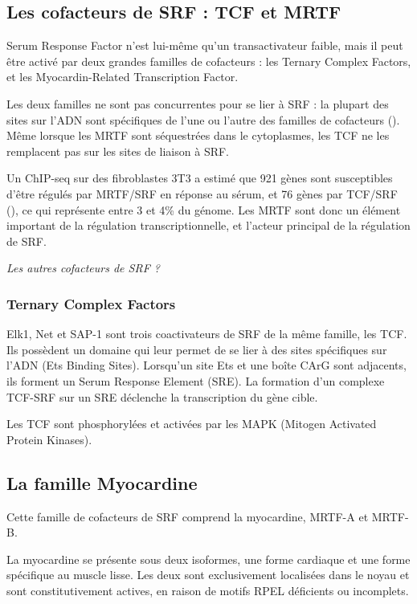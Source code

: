 \documentclass{report}
\begin{document}
\subsection{Les cofacteurs de SRF : TCF et MRTF}

Serum Response Factor n'est lui-même qu'un transactivateur faible, mais il peut être activé par deux grandes familles de cofacteurs : les Ternary Complex Factors, et les Myocardin-Related Transcription Factor. 

Les deux familles ne sont pas concurrentes pour se lier à SRF : la plupart des sites sur l'ADN sont spécifiques de l'une ou l'autre des familles de cofacteurs (\cite{esnault_rho-actin_2014}). Même lorsque les MRTF sont séquestrées dans le cytoplasmes, les TCF ne les remplacent pas sur les sites de liaison à SRF. 

Un ChIP-seq sur des fibroblastes 3T3 a estimé que 921 gènes sont susceptibles d'être régulés par MRTF/SRF en réponse au sérum, et 76 gènes par TCF/SRF (\cite{esnault_rho-actin_2014}), ce qui représente entre 3 et 4\% du génome. Les MRTF sont donc un élément important de la régulation transcriptionnelle, et l'acteur principal de la régulation de SRF. 

\emph{Les autres cofacteurs de SRF ? }


\subsubsection{Ternary Complex Factors}

Elk1, Net et SAP-1 sont trois coactivateurs de SRF de la même famille, les TCF. Ils possèdent un domaine qui leur permet de se lier à des sites spécifiques sur l'ADN (Ets Binding Sites). 
Lorsqu'un site Ets et une boîte CArG sont adjacents, ils forment un Serum Response Element (SRE). La formation d'un complexe TCF-SRF sur un SRE déclenche la transcription du gène cible. 

Les TCF sont phosphorylées et activées par les MAPK (Mitogen Activated Protein Kinases). 


\subsection{La famille Myocardine}

Cette famille de cofacteurs de SRF comprend la myocardine, MRTF-A et MRTF-B. 

La myocardine se présente sous deux isoformes, une forme cardiaque et une forme spécifique au muscle lisse. Les deux sont exclusivement localisées dans le noyau et sont constitutivement actives, en raison de motifs RPEL déficients ou incomplets. 
\end{document}
